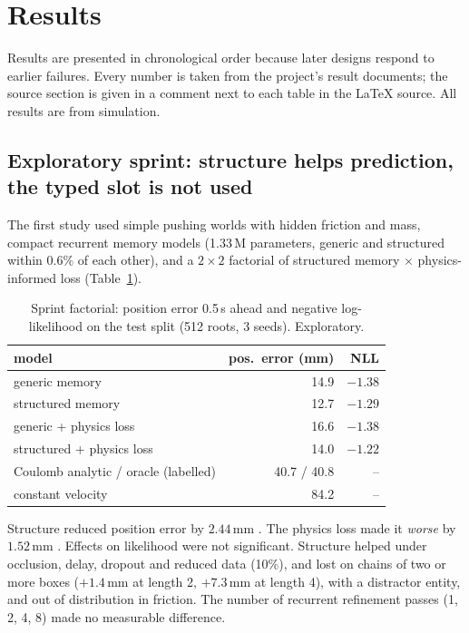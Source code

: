\section{Results}
\label{sec:results}

Results are presented in chronological order because later designs respond to earlier failures. Every number
is taken from the project's result documents; the source section is given in a comment next to each table in
the \LaTeX{} source. All results are from simulation.

\subsection{Exploratory sprint: structure helps prediction, the typed slot is not used}
\label{sec:res-sprint}

The first study used simple pushing worlds with hidden friction and mass, compact recurrent memory models
(1.33\,M parameters, generic and structured within 0.6\% of each other), and a $2\times2$ factorial of
structured memory $\times$ physics-informed loss (Table~\ref{tab:factorial}).

\begin{table}[!htbp]
  \centering\small
  \caption{Sprint factorial: position error 0.5\,s ahead and negative log-likelihood on the test split
  (512 roots, 3 seeds). Exploratory.}
  \label{tab:factorial}
  \begin{tabular}{@{}lrr@{}}
    \toprule
    model & pos.\ error (mm) & NLL \\
    \midrule
    generic memory                 & 14.9 & $-1.38$ \\
    structured memory              & 12.7 & $-1.29$ \\
    generic + physics loss         & 16.6 & $-1.38$ \\
    structured + physics loss      & 14.0 & $-1.22$ \\
    Coulomb analytic / oracle (labelled) & 40.7 / 40.8 & -- \\
    constant velocity              & 84.2 & -- \\
    \bottomrule
  \end{tabular}
\end{table}

Structure reduced position error by $2.44$\,mm . The physics loss made it \emph{worse} by
$1.52$\,mm . Effects on likelihood were not significant. Structure helped under occlusion,
delay, dropout and reduced data (10\%), and lost on chains of two or more boxes ($+1.4$\,mm at length 2,
$+7.3$\,mm at length 4), with a distractor entity, and out of distribution in friction. The number of
recurrent refinement passes (1, 2, 4, 8) made no measurable difference.

